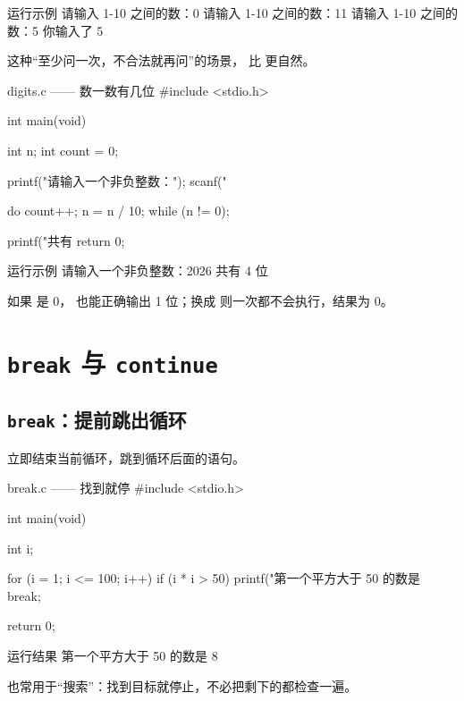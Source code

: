 \begin{outbox}{运行示例}
请输入 1-10 之间的数：0
请输入 1-10 之间的数：11
请输入 1-10 之间的数：5
你输入了 5
\end{outbox}

这种“至少问一次，不合法就再问”的场景， 比  更自然。

\begin{codebox}{digits.c —— 数一数有几位}
#include <stdio.h>

int main(void)
{
    int n;
    int count = 0;

    printf("请输入一个非负整数：");
    scanf("%

    do {
        count++;
        n = n / 10;
    } while (n != 0);

    printf("共有 %
    return 0;
}
\end{codebox}

\begin{outbox}{运行示例}
请输入一个非负整数：2026
共有 4 位
\end{outbox}

如果  是 0， 也能正确输出 1 位；换成  则一次都不会执行，结果为 0。

\section{\texttt{break} 与 \texttt{continue}}

\subsection{\texttt{break}：提前跳出循环}

 立即结束当前循环，跳到循环后面的语句。

\begin{codebox}{break.c —— 找到就停}
#include <stdio.h>

int main(void)
{
    int i;

    for (i = 1; i <= 100; i++) {
        if (i * i > 50) {
            printf("第一个平方大于 50 的数是 %
            break;
        }
    }

    return 0;
}
\end{codebox}

\begin{outbox}{运行结果}
第一个平方大于 50 的数是 8
\end{outbox}

 也常用于“搜索”：找到目标就停止，不必把剩下的都检查一遍。

